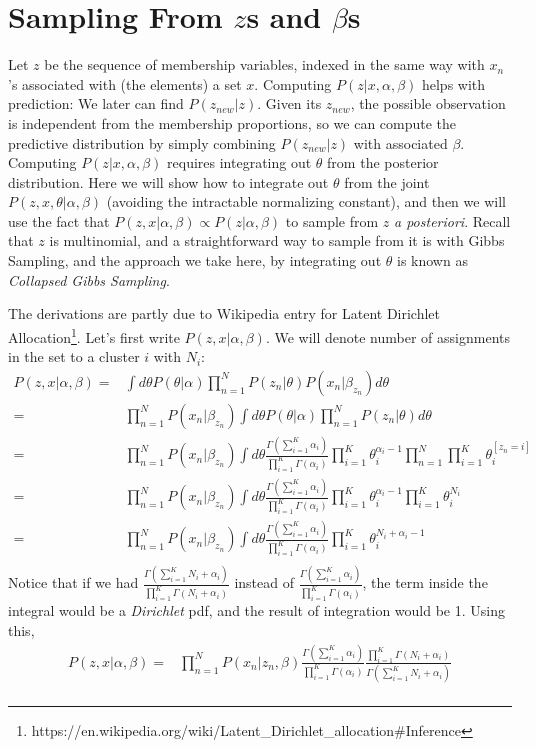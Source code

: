 \documentclass{article}%
\begin{document}
\section{Sampling From $z$s and $\beta$s}
Let $z$ be the sequence of membership variables, indexed in the same way with $x_n$'s associated with (the elements) a set $x$. Computing $P(z|x, \alpha, \beta)$ helps with prediction: We later can find $P(z_{new}|z)$. Given its $z_{new}$, the possible observation is independent from the membership proportions, so we can compute the predictive distribution by simply combining $P(z_{new}|z)$ with associated $\beta$. Computing $P(z|x, \alpha, \beta)$ requires integrating out $\theta$ from the posterior distribution. Here we will show how to integrate out $\theta$ from the joint  $P(z, x, \theta|\alpha, \beta)$ (avoiding the intractable normalizing constant), and then we will use the fact that $P(z, x|\alpha, \beta) \propto P(z|\alpha, \beta)$ to sample from $z$ \textit{a posteriori}. Recall that $z$ is multinomial, and a straightforward way to sample from it is with Gibbs Sampling, and the approach we take here, by integrating out $\theta$ is known as \textit{Collapsed Gibbs Sampling}.

The derivations are partly due to Wikipedia entry for Latent Dirichlet Allocation\footnote{https://en.wikipedia.org/wiki/Latent\_Dirichlet\_allocation\#Inference}. Let's first write $P(z, x|\alpha, \beta)$. We will denote number of assignments in the set to a cluster $i$ with $N_i$:
\begin{align*}
P(z, x|\alpha, \beta) =& \int d\theta P(\theta|\alpha) \prod_{n=1}^{N} P(z_n |\theta) P(x_n|\beta_{z_n}) d\theta\\
=&  \prod_{n=1}^{N} P(x_n|\beta_{z_n})  \int d\theta P(\theta|\alpha) \prod_{n=1}^{N} P(z_n |\theta) d\theta\\
=&  \prod_{n=1}^{N} P(x_n|\beta_{z_n}) \int d\theta \frac{\Gamma(\sum_{i=1}^K \alpha_i)}{\prod_{i=1}^K \Gamma(\alpha_i)}  \prod_{i=1}^K\theta_i^{\alpha_i - 1} \prod_{n=1}^N \prod_{i=1}^K \theta_i^{[z_n = i]}\\
=& \prod_{n=1}^{N} P(x_n|\beta_{z_n})   \int d\theta \frac{\Gamma(\sum_{i=1}^K \alpha_i)}{\prod_{i=1}^K \Gamma(\alpha_i)} \prod_{i=1}^K\theta_i^{\alpha_i - 1} \prod_{i=1}^K \theta_i^{N_i}\\
=& \prod_{n=1}^{N} P(x_n|\beta_{z_n})  \int d\theta \frac{\Gamma(\sum_{i=1}^K \alpha_i)}{\prod_{i=1}^K \Gamma(\alpha_i)}  \prod_{i=1}^K \theta_i^{N_i + \alpha_i -1}\\
\end{align*}
Notice that if we had $\frac{\Gamma(\sum_{i=1}^K N_i + \alpha_i)}{\prod_{i=1}^K \Gamma(N_i + \alpha_i)}$ instead of $\frac{\Gamma(\sum_{i=1}^K \alpha_i)}{\prod_{i=1}^K \Gamma(\alpha_i)}$, the term inside the integral would be a \textit{Dirichlet} pdf, and the result of integration would be 1. Using this, 
\begin{align*}
P(z, x|\alpha, \beta) =& \prod_{n=1}^{N} P(x_n|z_n, \beta) \frac{\Gamma(\sum_{i=1}^K \alpha_i)}{\prod_{i=1}^K \Gamma(\alpha_i)}  \frac{\prod_{i=1}^K \Gamma(N_i + \alpha_i)}{\Gamma(\sum_{i=1}^K N_i + \alpha_i)}\\
\end{align*}
\end{document}
